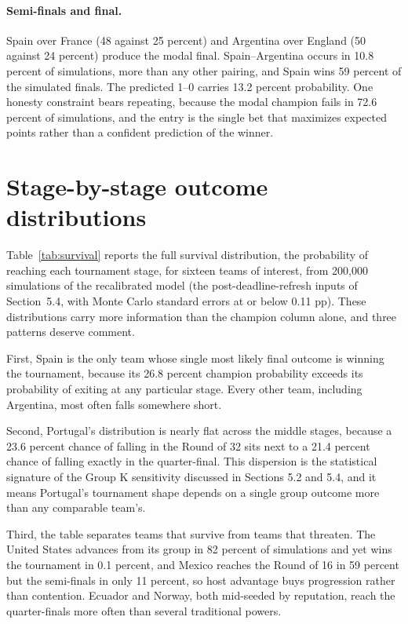 \documentclass[11pt,a4paper]{article}
\begin{document}
\paragraph{Semi-finals and final.} Spain over France (48 against 25 percent) and Argentina over England (50 against 24 percent) produce the modal final. Spain--Argentina occurs in 10.8 percent of simulations, more than any other pairing, and Spain wins 59 percent of the simulated finals. The predicted 1--0 carries 13.2 percent probability. One honesty constraint bears repeating, because the modal champion fails in 72.6 percent of simulations, and the entry is the single bet that maximizes expected points rather than a confident prediction of the winner.

\section{Stage-by-stage outcome distributions}\label{app:survival}

Table~\ref{tab:survival} reports the full survival distribution, the probability of reaching each tournament stage, for sixteen teams of interest, from 200{,}000 simulations of the recalibrated model (the post-deadline-refresh inputs of Section~5.4, with Monte Carlo standard errors at or below 0.11 pp). These distributions carry more information than the champion column alone, and three patterns deserve comment.

First, Spain is the only team whose single most likely final outcome is winning the tournament, because its 26.8 percent champion probability exceeds its probability of exiting at any particular stage. Every other team, including Argentina, most often falls somewhere short.

Second, Portugal's distribution is nearly flat across the middle stages, because a 23.6 percent chance of falling in the Round of 32 sits next to a 21.4 percent chance of falling exactly in the quarter-final. This dispersion is the statistical signature of the Group K sensitivity discussed in Sections 5.2 and 5.4, and it means Portugal's tournament shape depends on a single group outcome more than any comparable team's.

Third, the table separates teams that survive from teams that threaten. The United States advances from its group in 82 percent of simulations and yet wins the tournament in 0.1 percent, and Mexico reaches the Round of 16 in 59 percent but the semi-finals in only 11 percent, so host advantage buys progression rather than contention. Ecuador and Norway, both mid-seeded by reputation, reach the quarter-finals more often than several traditional powers.
\end{document}
